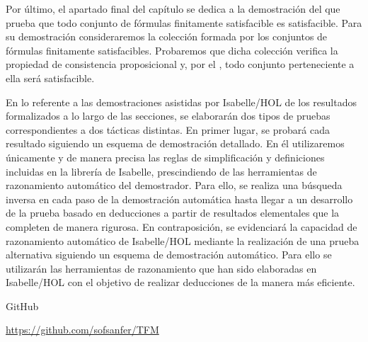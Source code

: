 \begin{isabellebody}
\begin{isamarkuptext}
  Por último, el apartado final del capítulo se dedica a la demostración del 
   que prueba que todo conjunto de fórmulas finitamente 
  satisfacible es satisfacible. Para su demostración consideraremos la 
  colección formada por los conjuntos de fórmulas finitamente satisfacibles. 
  Probaremos que dicha colección verifica la propiedad de consistencia 
  proposicional y, por el , todo conjunto 
  perteneciente a ella será satisfacible. 

  En lo referente a las demostraciones asistidas por Isabelle/HOL de
  los resultados formalizados a lo largo de las secciones, se elaborarán 
  dos tipos de pruebas correspondientes a dos tácticas distintas. En 
  primer lugar, se probará cada resultado siguiendo un esquema de 
  demostración detallado. En él utilizaremos únicamente y de manera 
  precisa las reglas de simplificación y definiciones incluidas en la 
  librería de Isabelle, prescindiendo de las herramientas de 
  razonamiento automático del demostrador. Para ello, se realiza una 
  búsqueda inversa en cada paso de la demostración automática hasta 
  llegar a un desarrollo de la prueba basado en deducciones a partir de
  resultados elementales que la completen de manera rigurosa. En 
  contraposición, se evidenciará la capacidad de razonamiento 
  automático de Isabelle/HOL mediante la realización de una prueba 
  alternativa siguiendo un esquema de demostración automático. Para 
  ello se utilizarán las herramientas de razonamiento que han sido 
  elaboradas en Isabelle/HOL con el objetivo de realizar deducciones de 
  la manera más eficiente.

   GitHub  

\href{https://github.com/sofsanfer/TFM}
                  {\url{https://github.com/sofsanfer/TFM}}%
\end{isamarkuptext}\isamarkuptrue%
%
\isadelimtheory
%
\endisadelimtheory
%
\isatagtheory
%
\endisatagtheory
{\isafoldtheory}%
%
\isadelimtheory
%
\endisadelimtheory
%
\end{isabellebody}%
\endinput
